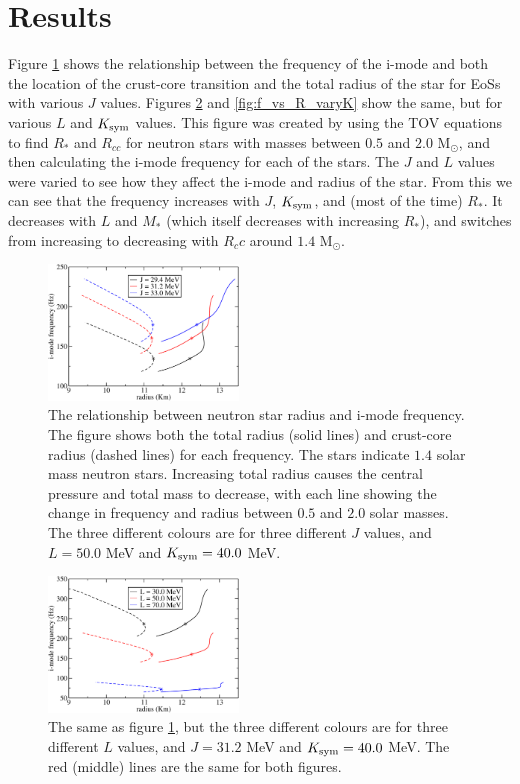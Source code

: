 \documentclass[fleqn,usenatbib]{mnras}
\begin{document}
\section{Results}
\hspace{\parindent}Figure \ref{fig:f_vs_R_varyJ} shows the relationship between the frequency of the i-mode and both the location of the crust-core transition and the total radius of the star for EoSs with various $J$ values. Figures \ref{fig:f_vs_R_varyL} and \ref{fig:f_vs_R_varyK} show the same, but for various $L$ and $K_{\rm sym}$ values. This figure was created by using the TOV equations to find $R_*$ and $R_{cc}$ for neutron stars with masses between $0.5$ and $2.0$ M$_{\odot}$, and then calculating the i-mode frequency for each of the stars. The $J$ and $L$ values were varied to see how they affect the i-mode and radius of the star. From this we can see that the frequency increases with $J$, $K_{\rm sym}$, and (most of the time) $R_*$. It decreases with $L$ and $M_*$ (which itself decreases with increasing $R_*$), and switches from increasing to decreasing with $R_cc$ around $1.4$ M$_{\odot}$.

\begin{figure}
\centering
\includegraphics[width=0.45\textwidth,angle=0]{f_Rcc_Rstar_Jvary.pdf}
\caption{The relationship between neutron star radius and i-mode frequency. The figure shows both the total radius (solid lines) and crust-core radius (dashed lines) for each frequency. The stars indicate $1.4$ solar mass neutron stars. Increasing total radius causes the central pressure and total mass to decrease, with each line showing the change in frequency and radius between $0.5$ and $2.0$ solar masses. The three different colours are for three different $J$ values, and $L=50.0$ MeV and $K_{\rm sym}=40.0$ MeV.}
\label{fig:f_vs_R_varyJ}
\end{figure}

\begin{figure}
\centering
\includegraphics[width=0.45\textwidth,angle=0]{f_Rcc_Rstar_Lvary.pdf}
\caption{The same as figure \ref{fig:f_vs_R_varyJ}, but the three different colours are for three different $L$ values, and $J=31.2$ MeV and $K_{\rm sym}=40.0$ MeV. The red (middle) lines are the same for both figures.}
\label{fig:f_vs_R_varyL}
\end{figure}
\end{document}
